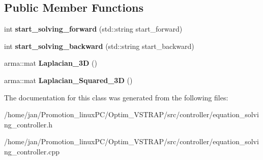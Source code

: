 \subsection*{Public Member Functions}
\begin{DoxyCompactItemize}
\item 
\mbox{\label{classequation__solving__controller_a281a20e8a2bb4b0b63f839ffbfea51b3}} 
int {\bfseries start\+\_\+solving\+\_\+forward} (std\+::string start\+\_\+forward)
\item 
\mbox{\label{classequation__solving__controller_a549c5c85c794cf0e7fbeacc3600fd830}} 
int {\bfseries start\+\_\+solving\+\_\+backward} (std\+::string start\+\_\+backward)
\item 
\mbox{\label{classequation__solving__controller_a3488080edc0c9a8cf8579fcd466ca429}} 
arma\+::mat {\bfseries Laplacian\+\_\+3D} ()
\item 
\mbox{\label{classequation__solving__controller_a3ecc85d3b88fd0350ed0af025638de1c}} 
arma\+::mat {\bfseries Laplacian\+\_\+\+Squared\+\_\+3D} ()
\end{DoxyCompactItemize}


The documentation for this class was generated from the following files\+:\begin{DoxyCompactItemize}
\item 
/home/jan/\+Promotion\+\_\+linux\+P\+C/\+Optim\+\_\+\+V\+S\+T\+R\+A\+P/src/controller/equation\+\_\+solving\+\_\+controller.\+h\item 
/home/jan/\+Promotion\+\_\+linux\+P\+C/\+Optim\+\_\+\+V\+S\+T\+R\+A\+P/src/controller/equation\+\_\+solving\+\_\+controller.\+cpp\end{DoxyCompactItemize}
